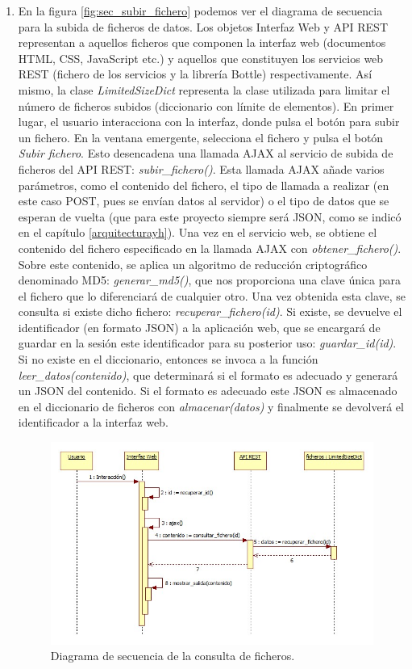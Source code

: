 \begin{enumerate}
\item En la figura \ref{fig:sec_subir_fichero} podemos ver el diagrama de secuencia para la subida de ficheros de datos. Los objetos Interfaz Web y API REST representan a aquellos ficheros que componen la interfaz web (documentos HTML, CSS, JavaScript etc.) y aquellos que constituyen los servicios web REST (fichero de los servicios y la librería Bottle) respectivamente. Así mismo, la clase \textit{LimitedSizeDict} representa la clase utilizada para limitar el número de ficheros subidos (diccionario con límite de elementos). En primer lugar, el usuario interacciona con la interfaz, donde pulsa el botón para subir un fichero. En la ventana emergente, selecciona el fichero y pulsa el botón \textit{Subir fichero}. Esto desencadena una llamada AJAX al servicio de subida de ficheros del API REST: \textit{subir\_fichero()}. Esta llamada AJAX añade varios parámetros, como el contenido del fichero, el tipo de llamada a realizar (en este caso POST, pues se envían datos al servidor) o el tipo de datos que se esperan de vuelta (que para este proyecto siempre será JSON, como se indicó en el capítulo \ref{arquitecturayh}). Una vez en el servicio web, se obtiene el contenido del fichero especificado en la llamada AJAX con \textit{obtener\_fichero()}. Sobre este contenido, se aplica un algoritmo de reducción criptográfico denominado MD5: \textit{generar\_md5()}, que nos proporciona una clave única para el fichero que lo diferenciará de cualquier otro. Una vez obtenida esta clave, se consulta si existe dicho fichero: \textit{recuperar\_fichero(id)}. Si existe, se devuelve el identificador (en formato JSON) a la aplicación web, que se encargará de guardar en la sesión este identificador para su posterior uso: \textit{guardar\_id(id)}. Si no existe en el diccionario, entonces se invoca a la función \textit{leer\_datos(contenido)}, que determinará si el formato es adecuado y generará un JSON del contenido. Si el formato es adecuado este JSON es almacenado en el diccionario de ficheros con \textit{almacenar(datos)} y finalmente se devolverá el identificador a la interfaz web.


\begin{figure}[H]
\centering
\includegraphics[scale=0.5]{figuras/sec_consultar_fichero.jpg}
\caption{Diagrama de secuencia de la consulta de ficheros.}
\label{fig:sec_consultar_fichero}
\end{figure}


\end{enumerate}

